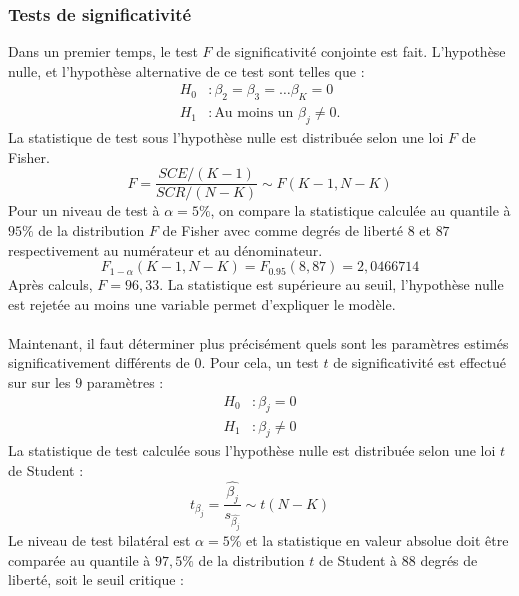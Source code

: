 \documentclass[12pt]{article}
\begin{document}
\subsubsection{Tests de significativité}
\label{sec:testSigni1}
Dans un premier temps, le test $F$ de significativité conjointe est fait. L'hypothèse nulle, et l'hypothèse alternative de ce test sont telles que :
\begin{equation*}
\begin{split}
    H_0 &: \beta_2 = \beta_3 = \dots \beta_K =0 \\
    H_1 &: \text{Au moins un }\beta_j \neq 0.
\end{split}
\end{equation*}
La statistique de test sous l'hypothèse nulle est distribuée selon une loi $F$ de Fisher.
\begin{equation*}
    F = \frac{SCE/(K-1)}{SCR/(N-K)} \sim F(K-1, N-K)
\end{equation*}
Pour un niveau de test à $\alpha = 5\%$, on compare la statistique calculée au quantile à $95\%$ de la distribution $F$ de Fisher avec 
comme degrés de liberté $8$ et $87$ respectivement au numérateur et au dénominateur. 
\begin{equation*}
    F_{1-\alpha} (K-1, N-K) = F_{0.95}(8, 87) = 2,0466714
\end{equation*}
Après calculs, $F = 96,33$. La statistique est supérieure au seuil, l'hypothèse nulle est rejetée au moins une variable permet d'expliquer le modèle.
\\ \\
Maintenant, il faut déterminer plus précisément quels sont les paramètres estimés significativement différents de 0. Pour cela, un test $t$ de 
significativité est effectué sur sur les $9$ paramètres :
\begin{equation*}
\begin{split}
    H_0 &: \beta_j =0 \\
    H_1 &: \beta_j \neq 0
\end{split}
\end{equation*}
La statistique de test calculée sous l'hypothèse nulle est distribuée selon une loi $t$ de Student : 
\begin{equation*}
    t_{\beta_j} = \frac{\hat{\beta_j}}{s_{\hat{\beta_j}}} \sim t(N-K)
\end{equation*}
Le niveau de test bilatéral est $\alpha = 5\%$ et la statistique en valeur absolue doit être comparée au quantile à $97,5\%$ de la distribution
 $t$ de Student à $88$ degrés de liberté, soit le seuil critique :
\end{document}
